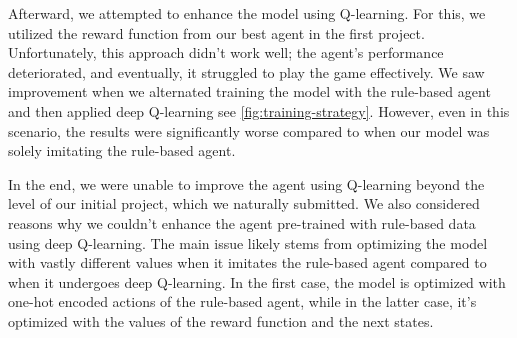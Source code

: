 Afterward, we attempted to enhance the model using Q-learning. For this, we utilized the reward function from our best agent in the first project. 
Unfortunately, this approach didn't work well; the agent's performance deteriorated, and eventually, it struggled to play the game effectively. 
We saw improvement when we alternated training the model with the rule-based agent and then applied deep Q-learning see \autoref{fig:training-strategy}. 
However, even in this scenario, 
the results were significantly worse compared to when our model was solely imitating the rule-based agent.

In the end, we were unable to improve the agent using Q-learning beyond the level of our initial project, 
which we naturally submitted. We also considered reasons why we couldn't enhance the agent pre-trained with rule-based 
data using deep Q-learning. The main issue likely stems from optimizing the model with vastly different values when it imitates 
the rule-based agent compared to when it undergoes deep Q-learning. In the first case, the model is optimized with one-hot encoded 
actions of the rule-based agent, while in the latter case, it's optimized with the values of the reward function and the next states.